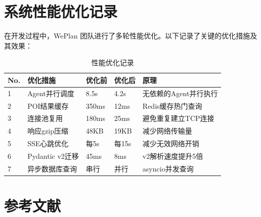 \documentclass[12pt,a4paper]{ctexart}
\begin{document}
\section{系统性能优化记录}

在开发过程中，WePlan 团队进行了多轮性能优化。以下记录了关键的优化措施及其效果：

\begin{table}[H]
\centering
\caption{性能优化记录}
\label{tab:perf-optimization}
\renewcommand{\arraystretch}{1.3}
{\small
\begin{tabular}{p{0.5cm} p{3.5cm} p{2cm} p{2cm} p{3.5cm}}
\toprule
\textbf{No.} & \textbf{优化措施} & \textbf{优化前} & \textbf{优化后} & \textbf{原理} \\
\midrule
1 & Agent并行调度 & 8.5s & 4.2s & 无依赖的Agent并行执行 \\
2 & POI结果缓存 & 350ms & 12ms & Redis缓存热门查询 \\
3 & 连接池复用 & 180ms & 25ms & 避免重复建立TCP连接 \\
4 & 响应gzip压缩 & 48KB & 19KB & 减少网络传输量 \\
5 & SSE心跳优化 & 每5s & 每15s & 减少无效网络开销 \\
6 & Pydantic v2迁移 & 45ms & 8ms & v2解析速度提升5倍 \\
7 & 异步数据库查询 & 串行 & 并行 & asyncio并发查询 \\
\bottomrule
\end{tabular}
}
\end{table}

\section{参考文献}
\end{document}

